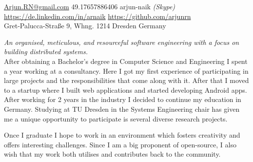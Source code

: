 \documentclass[10pt,a4paper]{article}
\begin{document}
\sloppy  %


\nobreakvspace{0.3em}  %

\noindent\href{mailto:Arjun.RN@gmail.com}{Arjun.RN\mbox{}@\mbox{}gmail.com}\sbull
\textsmaller{+}49.17657886406
\sbull arjun-naik \emph{(Skype)}
\\
\sbull
\href{https://de.linkedin.com/in/arnaik}{https://de.linkedin.com/in/arnaik}
\sbull
\href{https://github.com/arjunrn}{https://github.com/arjunrn}
\\
Gret-Palucca-Stra{\ss}e 9, Whng. 1214\sbull
Dresden\sbull
Germany

\spacedhrule{0.9em}{-0.4em}  %


\vspace{-1.3em}  %
\begin{multicols}{2}  %
\noindent \emph{An organised, meticulous, and resourceful software engineering with a focus on building distributed systems.}
\\
After obtaining a Bachelor's degree in Computer Science and Engineering I spent a year working at a consultancy. Here I got my first experience of participating in large projects and the responsibilities that come along with it. After that I moved to a startup where I built web applications and started developing Android apps. After working for 2 years in the industry I decided to continue my education in Germany. Studying at TU Dresden in the Systems Engineering chair has given me a unique opportunity to participate is several diverse research projects.

Once I graduate I hope to work in an environment which fosters creativity and offers interesting challenges. Since I am a big proponent of open-source, I also wish that my work both utilises and contributes back to the community.

\end{multicols}
\end{document}
